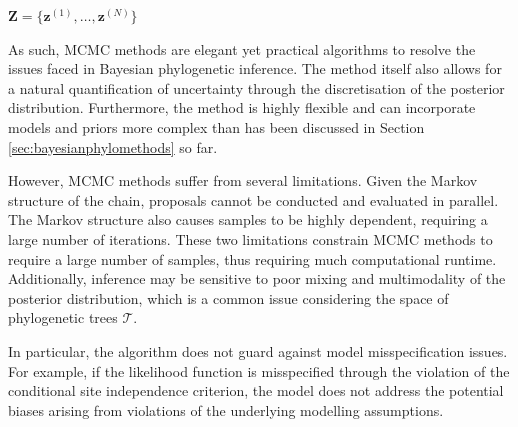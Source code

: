 \begin{algorithm}
\SetAlgoLined
{}
\LinesNumbered
{}

\BlankLine
{}
\BlankLine
{}

\Return $\mathbf{Z} = \{\mathbf{z}^{(1)}, \dots, \mathbf{z}^{(N)}\}$


 \caption{Metropolis-Hastings (MCMC) algorithm, adapted from \cite{Douc2019}.}
 \label{algo:mh}
\end{algorithm}

As such, MCMC methods are elegant yet practical algorithms to resolve the issues faced in Bayesian phylogenetic inference. The method itself also allows for a natural quantification of uncertainty through the discretisation of the posterior distribution. Furthermore, the method is highly flexible and can incorporate models and priors more complex than has been discussed in Section \ref{sec:bayesianphylomethods} so far.

However, MCMC methods suffer from several limitations. Given the Markov structure of the chain, proposals cannot be conducted and evaluated in parallel. The Markov structure also causes samples to be highly dependent, requiring a large number of iterations. These two limitations constrain MCMC methods to require a large number of samples, thus requiring much computational runtime. Additionally, inference may be sensitive to poor mixing and multimodality of the posterior distribution, which is a common issue considering the space of phylogenetic trees $\mathcal{T}$.

In particular, the algorithm does not guard against model misspecification issues. For example, if the likelihood function is misspecified through the violation of the conditional site independence criterion, the model does not address the potential biases arising from violations of the underlying modelling assumptions.



